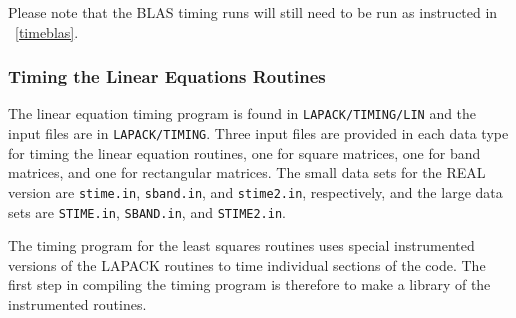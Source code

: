 Please note that the BLAS
timing runs will still need to be run as instructed in ~\ref{timeblas}.

\subsubsection{Timing the Linear Equations Routines}\label{timelin}

\dent
The linear equation timing program is found in {\tt LAPACK/TIMING/LIN}
and the input files are in {\tt LAPACK/TIMING}.
Three input files are provided in each data type for timing the
linear equation routines, one for square matrices, one for band
matrices, and one for rectangular matrices.  The small data sets for the REAL version
are {\tt stime.in}, {\tt sband.in}, and {\tt stime2.in}, respectively,
and the large data sets are
{\tt STIME.in}, {\tt SBAND.in}, and {\tt STIME2.in}.

The timing program for the least squares routines uses special instrumented
versions of the LAPACK routines to time individual sections of the code.
The first step in compiling the timing program is therefore to make a library
of the instrumented routines.

